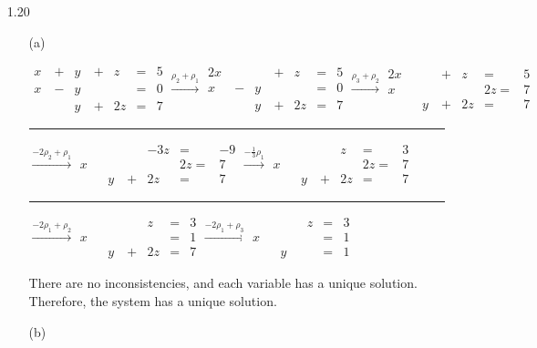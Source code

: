 \documentclass{article}
\begin{document}
\begin{enumerate}
\item[1.20]

\begin{enumerate}

\item[(a)]

$\begin{aligned}
x&\ +&y&\ +&z&=&5\\
x&\ -&y&&&=&0\\
&&y&\ +&2z&=&7
\end{aligned}
\overset{\rho_2+\rho_1}{\longrightarrow}
\begin{aligned}
2x&&&\ +&z&=&5\\
x&\ -&y&&&=&0\\
&&y&\ +&2z&=&7
\end{aligned}
\overset{\rho_3+\rho_2}{\longrightarrow}
\begin{aligned}
2x&&&\ +&z&=&5\\
x&&&&&2z=&7\\
&&y&\ +&2z&=&7
\end{aligned}$

\hrule

$\overset{-2\rho_2+\rho_1}{\longrightarrow}
\begin{aligned}
&&&&-3z&=&-9\\
x&&&&&2z=&7\\
&&y&\ +&2z&=&7
\end{aligned}
\overset{-\frac{1}{3}\rho_1}{\longrightarrow}
\begin{aligned}
&&&&z&=&3\\
x&&&&&2z=&7\\
&&y&\ +&2z&=&7
\end{aligned}$

\hrule

$\overset{-2\rho_1+\rho_2}{\longrightarrow}
\begin{aligned}
&&&&z&=&3\\
x&&&&&=&1\\
&&y&\ +&2z&=&7
\end{aligned}
\overset{-2\rho_1+\rho_3}{\longrightarrow}
\begin{aligned}
&&&&z&=&3\\
x&&&&&=&1\\
&&y&&&=&1
\end{aligned}$

There are no inconsistencies, and each variable has a unique solution. Therefore, the system has a unique solution.

\item[(b)]


\end{enumerate}
\end{enumerate}
\end{document}
